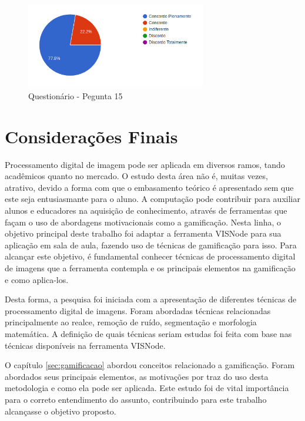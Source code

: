 \documentclass[
	12pt,				%
	oneside,			%
	a4paper,			%
	english,			%
	french,				%
	spanish,			%
	brazil,				%
	]{abntex2}
\begin{document}
\begin{figure}[H]
\centering
\caption{Questionário - Pegunta 15}
\includegraphics[width=0.7\textwidth]{imagens/v1/p15.png}
\sourceAuthor
\end{figure}


% 

\chapter[Considerações Finais]{Considerações Finais}

Processamento digital de imagem pode ser aplicada em diversos ramos, tando acadêmicos quanto no mercado. O estudo desta área não é, muitas vezes, atrativo, devido a forma com que o embasamento teórico é apresentado sem que este seja entusiasmante para o aluno. A computação pode contribuir para auxiliar alunos e educadores na aquisição de conhecimento, através de ferramentas que façam o uso de abordagens motivacionais como a gamificação. Nesta linha, o objetivo principal deste trabalho foi adaptar a ferramenta VISNode para sua aplicação em sala de aula, fazendo uso de técnicas de gamificação para isso. Para alcançar este objetivo, é fundamental conhecer técnicas de processamento digital de imagens que a ferramenta contempla e os principais elementos na gamificação e como aplica-los.

Desta forma, a pesquisa foi iniciada com a apresentação de diferentes técnicas de processamento digital de imagens. Foram abordadas técnicas relacionadas principalmente ao realce, remoção de ruído, segmentação e morfologia matemática. A definição de quais técnicas seriam estudas foi feita com base nas técnicas disponíveis na ferramenta VISNode.

O capítulo \ref{sec:gamificacao} abordou conceitos relacionado a gamificação. Foram abordados seus principais elementos, as motivações por traz do uso desta metodologia e como ela pode ser aplicada.
Este estudo foi de vital importância para o correto entendimento do assunto, contribuindo para este trabalho alcançasse o objetivo proposto.
\end{document}
